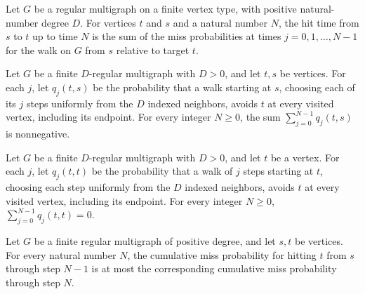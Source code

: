 \begin{definition}
\label{Randomized.RegularMultigraph.hitTime}
\leanok
{}
Let $G$ be a regular multigraph on a finite vertex type, with positive natural-number
degree $D$. For vertices $t$ and $s$ and a natural number $N$, the hit time from $s$ to
$t$ up to time $N$ is the sum of the miss probabilities at times $j=0,1,\ldots,N-1$
for the walk on $G$ from $s$ relative to target $t$.
\end{definition}

\begin{theorem}
\label{Randomized.RegularMultigraph.hitTime_nonneg}
\leanok
{}
Let $G$ be a finite $D$-regular multigraph with $D>0$, and let $t,s$ be vertices. For
each $j$, let $q_j(t,s)$ be the probability that a walk starting at $s$, choosing each
of its $j$ steps uniformly from the $D$ indexed neighbors, avoids $t$ at every visited
vertex, including its endpoint. For every integer $N\ge 0$, the sum
$\sum_{j=0}^{N-1}q_j(t,s)$ is nonnegative.
\end{theorem}

\begin{theorem}
\label{Randomized.RegularMultigraph.hitTime_self}
\leanok
{}
Let $G$ be a finite $D$-regular multigraph with $D>0$, and let $t$ be a vertex. For each
$j$, let $q_j(t,t)$ be the probability that a walk of $j$ steps starting at $t$,
choosing each step uniformly from the $D$ indexed neighbors, avoids $t$ at every visited
vertex, including its endpoint. For every integer $N\ge 0$,
$\sum_{j=0}^{N-1}q_j(t,t)=0$.
\end{theorem}

\begin{theorem}
\label{Randomized.RegularMultigraph.hitTime_le_succ}
\leanok
{}
Let $G$ be a finite regular multigraph of positive degree, and let $s,t$ be vertices.
For every natural number $N$, the cumulative miss probability for hitting $t$ from $s$
through step $N-1$ is at most the corresponding cumulative miss probability through step
$N$.
\end{theorem}

